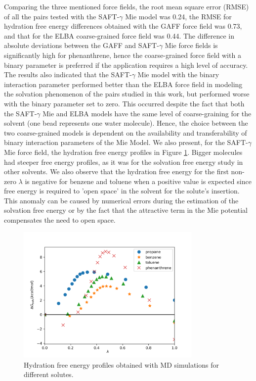 Comparing the three mentioned force fields, the root mean square error (RMSE) of all the pairs tested with the SAFT-$\gamma$ Mie model was  0.24, the RMSE for hydration free energy differences obtained with the GAFF force field was 0.73, and that for the ELBA coarse-grained force field was 0.44. The difference in absolute deviations between the GAFF and SAFT-$\gamma$     Mie force fields is significantly high for phenanthrene, hence the coarse-grained force field with a binary parameter is preferred if the application requires a high level of accuracy. The results also indicated that the SAFT-$\gamma$ Mie model with the binary interaction parameter performed better than the ELBA force field in modeling the solvation phenomenon of the pairs studied in this work, but performed worse with the binary parameter set to zero. This occurred despite the fact that both the SAFT-$\gamma$ Mie and ELBA models have the same level of coarse-graining for the solvent (one bead represents one water molecule). Hence, the choice between the two coarse-grained models is dependent on the availability and transferability of binary interaction parameters of the Mie Model. We also present, for the SAFT-$\gamma$ Mie force field, the hydration free energy profiles in Figure \ref{fig:water}. Bigger molecules had steeper free energy profiles, as it was for the solvation free energy study in other solvents. We also observe that the hydration free energy for the first non-zero $\lambda$ is negative for benzene and toluene when a positive value is expected since free energy is required to 'open space' in the solvent for the solute's insertion. This anomaly can be caused by numerical errors during the estimation of the solvation free energy or by the fact that the attractive term in the Mie potential compensates the need to open space. 

\begin{figure}[H]
\centering
\includegraphics[width=0.8\textwidth]{Figures/water}
\caption{Hydration free energy profiles obtained with MD simulations for different solutes.}
\label{fig:water}
\end{figure}

